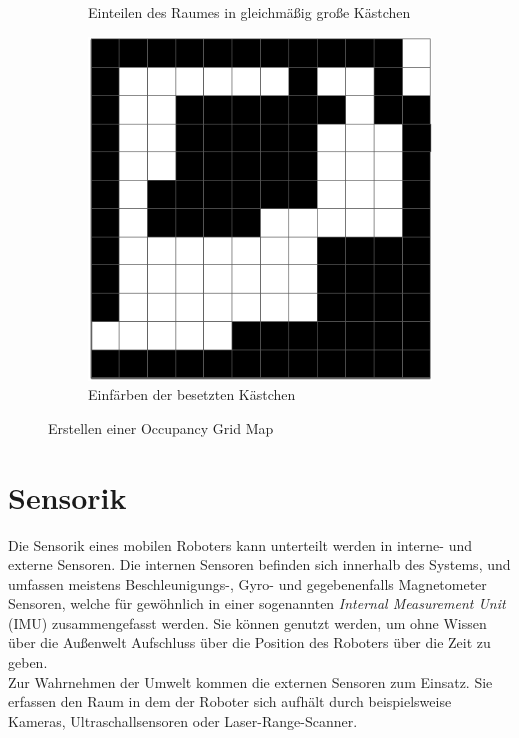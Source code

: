\begin{figure}
\begin{subfigure}[t]{.3\textwidth}
    \caption{Einteilen des Raumes in gleichmäßig große Kästchen}
  \end{subfigure}\hfill
  \begin{subfigure}[t]{.3\textwidth}
    \centering
    \includegraphics[width=.9\linewidth]{pic/vorwissen/2c_occupgridmap.png}
    \caption{Einfärben der besetzten Kästchen}
  \end{subfigure}
  \caption{Erstellen einer Occupancy Grid Map}
  \label{fig:occupanygridmap}
\end{figure}
\mbox{}


\section{Sensorik}\label{sec:Sensorik}
Die Sensorik eines mobilen Roboters kann unterteilt werden in interne- und externe Sensoren. Die internen Sensoren befinden sich innerhalb des Systems, und umfassen meistens Beschleunigungs-, Gyro- und gegebenenfalls Magnetometer Sensoren, welche für gewöhnlich in einer sogenannten \textit{Internal Measurement Unit} (IMU) zusammengefasst werden. Sie können genutzt werden, um ohne Wissen über die Außenwelt Aufschluss über die Position des Roboters über die Zeit zu geben.\\
Zur Wahrnehmen der Umwelt kommen die externen Sensoren zum Einsatz. Sie erfassen den Raum in dem der Roboter sich aufhält durch beispielsweise Kameras, Ultraschallsensoren oder Laser-Range-Scanner.


